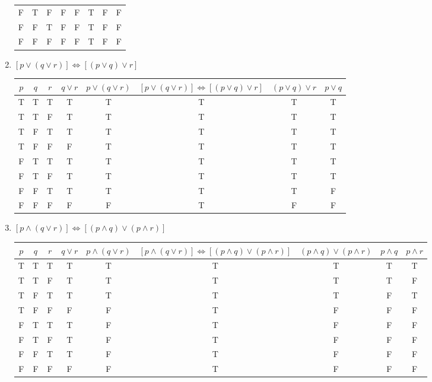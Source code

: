 \documentclass[11pt]{article} %
\begin{document}
\begin{enumerate}
\begin{center}
\begin{tabular}{|c|c|c|c|c|c|c|c|}
	F & T & F & F & F & T & F & F\\
	F & F & T & F & F & T & F & F\\
	F & F & F & F & F & T & F & F\\
	\hline
	\end{tabular}
	\end{center}
	\item $[p \lor (q \lor r)] \iff [(p\lor q) \lor r]$
	\begin{center}
	\begin{tabular}{|c|c|c|c|c|c|c|c|}
	\hline
	$p$ & $q$ & $r$ & $q \lor r$ & $p \lor (q \lor r)$ & $[p \lor (q \lor r)] \iff [(p\lor q) \lor r]$ & $(p\lor q) \lor r$ & $p \lor q$\\
	\hline
	T & T & T & T & T & T & T & T\\
	T & T & F & T & T & T & T & T\\
	T & F & T & T & T & T & T & T\\
	T & F & F & F & T & T & T & T\\
	F & T & T & T & T & T & T & T\\
	F & T & F & T & T & T & T & T\\
	F & F & T & T & T & T & T & F\\
	F & F & F & F & F & T & F & F\\
	\hline
	\end{tabular}
	\end{center}
	\item $[p \land (q \lor r)] \iff [(p\land q)\lor(p\land r)]$
	\begin{center}
	\hspace*{-2cm}
	\begin{tabular}{|c|c|c|c|c|c|c|c|c|}
	\hline
	$p$ & $q$ & $r$ & $q \lor r$ & $p \land (q\lor r)$ & $[p \land (q \lor r)] \iff [(p\land q)\lor(p\land r)]$ & $(p\land q)\lor(p\land r)$ & $p\land q$ & $p\land r$\\
	\hline
	T & T & T & T & T & T & T & T & T\\
	T & T & F & T & T & T & T & T & F\\
	T & F & T & T & T & T & T & F & T\\
	T & F & F & F & F & T & F & F & F\\
	F & T & T & T & F & T & F & F & F\\
	F & T & F & T & F & T & F & F & F\\
	F & F & T & T & F & T & F & F & F\\
	F & F & F & F & F & T & F & F & F\\
	\hline
	\end{tabular}

\end{center}
\end{enumerate}
\end{document}
